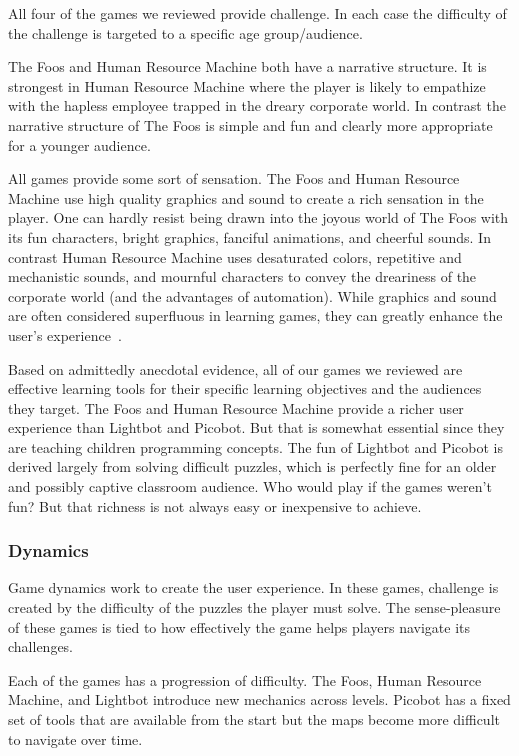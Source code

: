 \documentclass{sig-alternate-05-2015}
\begin{document}
All four of the games we reviewed provide challenge. In each case the difficulty of the challenge is targeted to a specific age group/audience. 



The Foos and Human Resource Machine both have a narrative structure. It is strongest in Human Resource Machine where the player is likely to empathize with the hapless employee trapped in the dreary corporate world. In contrast the narrative structure of The Foos is simple and fun and clearly more appropriate for a younger audience.



All games provide some sort of sensation. The Foos and Human Resource Machine use high quality graphics and sound to create a rich sensation in the player. One can hardly resist being drawn into the joyous world of The Foos with its fun characters, bright graphics, fanciful animations, and cheerful sounds. In contrast Human Resource Machine uses desaturated colors, repetitive and mechanistic sounds, and mournful characters to convey the dreariness of the corporate world (and the advantages of automation). While graphics and sound are often considered superfluous in learning games, they can greatly enhance the user's experience~\cite{juiceitorloseit}.



Based on admittedly anecdotal evidence, all of our games we reviewed are effective learning tools for their specific learning objectives and the audiences they target. The Foos and Human Resource Machine provide a richer user experience than Lightbot and Picobot. But that is somewhat essential since they are teaching children programming concepts. The fun of Lightbot and Picobot is derived largely from solving difficult puzzles, which is perfectly fine for an older and possibly captive classroom audience. Who would play if the games weren't fun? But that richness is not always easy or inexpensive to achieve. \subsubsection{Dynamics}


Game dynamics work to create the user experience. In these games, challenge is created by the difficulty of the puzzles the player must solve. The sense-pleasure of these games is tied to how effectively the game helps players navigate its challenges.



Each of the games has a progression of difficulty. The Foos, Human Resource Machine, and Lightbot introduce new mechanics across levels. Picobot has a fixed set of tools that are available from the start but the maps become more difficult to navigate over time.
\end{document}
